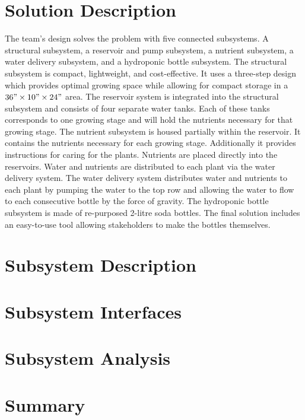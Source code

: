 \documentclass[12pt]{article}
\begin{document}
\section{Solution Description}
The team’s design solves the problem with five connected subsystems. A structural subsystem, a
reservoir and pump subsystem, a nutrient subsystem, a water delivery subsystem, and a hydroponic
bottle subsystem. The structural subsystem is compact, lightweight, and cost-effective. It uses a
three-step design which provides optimal growing space while allowing for compact storage in a $36"
\times 10" \times 24"$ area. The reservoir system is integrated into the structural subsystem and
consists of four separate water tanks. Each of these tanks corresponds to one growing stage and will
hold the nutrients necessary for that growing stage. The nutrient subsystem is housed partially
within the reservoir. It contains the nutrients necessary for each growing stage. Additionally it
provides instructions for caring for the plants. Nutrients are placed directly into the reservoirs.
Water and nutrients are distributed to each plant via the water delivery system. The water delivery
system distributes water and nutrients to each plant by pumping the water to the top row and
allowing the water to flow to each consecutive bottle by the force of gravity. The hydroponic bottle
subsystem is made of re-purposed 2-litre soda bottles. The final solution includes an easy-to-use
tool allowing stakeholders to make the bottles themselves.

\section{Subsystem Description}

\section{Subsystem Interfaces}

\section{Subsystem Analysis}

\section{Summary}

\pagebreak
\end{document}
